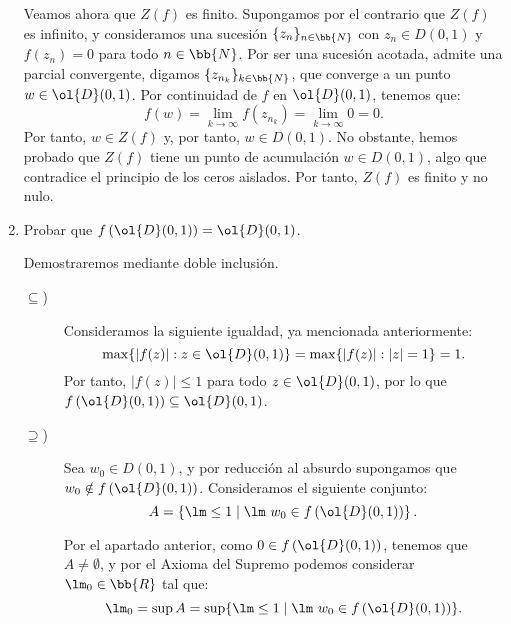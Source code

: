 \documentclass[12pt]{article}
\begin{document}
\begin{ejercicio}[2.5 puntos]
\begin{enumerate}
            Veamos ahora que $Z(f)$ es finito. Supongamos por el contrario que $Z(f)$ es infinito, y consideramos una sucesión $\{z_n\}_{n \in \bb{N}}$ con $z_n\in D(0, 1)$ y $f(z_n) = 0$ para todo $n \in \bb{N}$. Por ser una sucesión acotada, admite una parcial convergente, digamos $\{z_{n_k}\}_{k \in \bb{N}}$, que converge a un punto $w\in \ol{D}(0,1)$. Por continuidad de $f$ en $\ol{D}(0, 1)$, tenemos que:
            \begin{equation*}
                f(w) = \lim_{k\to\infty} f(z_{n_k}) = \lim_{k\to\infty} 0 = 0.
            \end{equation*}
            Por tanto, $w\in Z(f)$ y, por tanto, $w\in D(0, 1)$. No obstante, hemos probado que $Z(f)$ tiene un punto de acumulación $w\in D(0, 1)$, algo que contradice el principio de los ceros aislados. Por tanto, $Z(f)$ es finito y no nulo.
            \item Probar que $f\left(\ol{D}(0, 1)\right) = \ol{D}(0, 1)$.
            
            Demostraremos mediante doble inclusión.
            \begin{description}
                \item[$\subseteq$)] Consideramos la siguiente igualdad, ya mencionada anteriormente:
                \begin{equation*}
                    \max\{|f(z)| : z \in \ol{D}(0, 1)\} = \max\{|f(z)| : |z|=1\} = 1.
                \end{equation*}
                Por tanto, $|f(z)| \leq 1$ para todo $z \in \ol{D}(0, 1)$, por lo que $f\left(\ol{D}(0, 1)\right) \subseteq \ol{D}(0, 1)$.

                \item[$\supseteq$)] Sea $w_0 \in D(0, 1)$, y por reducción al absurdo supongamos que $w_0 \notin f\left(\ol{D}(0, 1)\right)$. Consideramos el siguiente conjunto:
                \begin{equation*}
                    A = \left\{\lm \leq 1\mid \lm\ w_0\in f\left(\ol{D}(0, 1)\right)\right\}.
                \end{equation*}

                Por el apartado anterior, como $0\in f\left(\ol{D}(0, 1)\right)$, tenemos que $A\neq \emptyset$, y por el Axioma del Supremo podemos considerar $\lm_0\in \bb{R}$ tal que:
                \begin{equation*}
                    \lm_0 = \sup A = \sup\{\lm \leq 1\mid \lm\ w_0\in f\left(\ol{D}(0, 1)\right)\}.
                \end{equation*}


\end{description}
\end{enumerate}
\end{ejercicio}
\end{document}
